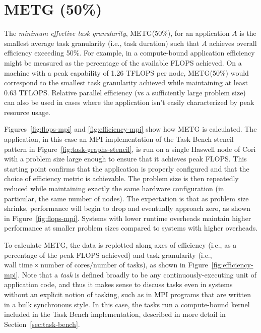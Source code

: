 \section{METG (50\%)}
\label{sec:metg}




The \emph{minimum effective task granularity}, METG(50\%), for an application $A$ is
the smallest average task granularity (i.e., task duration) such that $A$
achieves overall efficiency exceeding 50\%. For example, in
a compute-bound application efficiency might be measured as the
percentage of the available FLOPS achieved. On a machine with a peak
capability of 1.26 TFLOPS per node, METG(50\%) would correspond to
the smallest task granularity achieved while maintaining at least 0.63
TFLOPS. Relative parallel efficiency (vs a sufficiently large problem
size) can also be used in cases where the application isn't easily
characterized by peak resource usage.

Figures~\ref{fig:flops-mpi} and \ref{fig:efficiency-mpi} show how METG is
calculated. The application, in this case an MPI implementation of the
Task Bench stencil pattern in Figure~\ref{fig:task-graphs-stencil}, is
run on a single Haswell node of Cori with a problem size large enough to
ensure that it achieves peak FLOPS. This starting point confirms
that the application is properly configured and that the choice of
efficiency metric is achievable. The problem
size is then repeatedly reduced while maintaining exactly the same hardware
configuration (in particular, the same number of nodes). The
expectation is that as problem size shrinks,
performance will begin to drop and eventually approach zero, as shown in Figure~\ref{fig:flops-mpi}. Systems
with lower runtime overheads maintain higher performance at smaller
problem sizes compared to systems with higher overheads.

To calculate METG, the data is replotted along axes of efficiency
(i.e., as a percentage of the peak FLOPS achieved) and task
granularity (i.e., $\text{wall time} \times \text{number of
  cores}/\text{number of tasks}$), as shown in Figure~\ref{fig:efficiency-mpi}. Note that a \emph{task} is defined
broadly to be any continuously-executing unit of application code,
and thus it makes sense to discuss tasks even in systems
without an explicit notion of tasking, such as in MPI programs that
are written in a bulk synchronous style. In this case, the tasks run a
compute-bound kernel included in the Task Bench implementation,
described in more detail in Section~\ref{sec:task-bench}.

